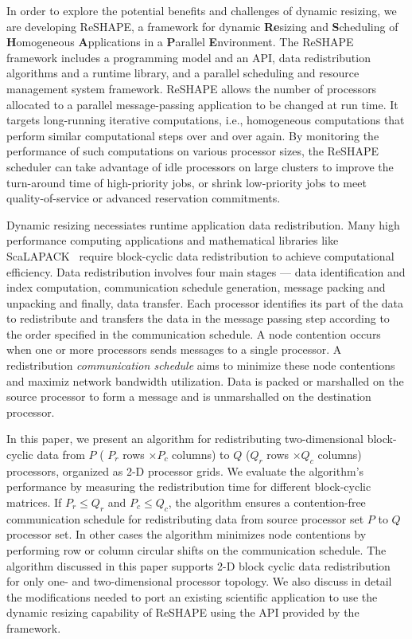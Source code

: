 \documentclass[letterpaper]{llncs}
\begin{document}
In order to explore the potential benefits and challenges of dynamic resizing, we are developing ReSHAPE, a framework for dynamic {\bf Re}sizing and {\bf S}cheduling of {\bf H}omo\-geneous {\bf A}pplications in a {\bf P}arallel {\bf E}nvironment. The ReSHAPE framework includes a programming model and an API, data redistribution algorithms and a runtime library, and a parallel scheduling and resource management system 
framework. 
ReSHAPE allows the number of processors allocated to a parallel message-passing application to be changed at run time.  
It targets long-running iterative computations, i.e., homogeneous computations that perform similar computational steps over and over again. 
By monitoring the performance of such computations on various processor sizes, 
the ReSHAPE scheduler can take advantage of idle processors on large 
clusters to improve the turn-around time of high-priority jobs, 
or shrink low-priority jobs to meet quality-of-service or advanced 
reservation commitments.

\vspace{-0.01in}
Dynamic resizing necessiates runtime application data redistribution.
Many high performance computing applications and mathematical libraries like ScaLAPACK~\cite{scalapack} require block-cyclic data redistribution to achieve 
computational efficiency. 
Data redistribution involves four main stages --- data identification and 
index computation, communication schedule generation, message packing and unpacking
 and finally, data transfer. 
Each processor identifies its part of the data to redistribute and transfers the 
data in the message passing step according to the order specified in the 
communication schedule. A node contention occurs when one or more processors
sends messages to a single processor. A redistribution \textit{communication schedule}
 aims to 
minimize these node contentions and maximiz network bandwidth utilization.
Data is packed or marshalled on the source processor to form a message and is unmarshalled on the destination processor.

\vspace{-0.01in}
In this paper, we present an algorithm for redistributing two-dimensional 
block-cyclic data from $P$ ( $P_r$ rows $\times P_c$ columns) to $Q$ 
($Q_r$ rows $\times Q_c$ columns) processors, organized as 2-D processor grids. 
We evaluate the algorithm's 
performance by measuring the redistribution time for different block-cyclic matrices.
If $P_r \leq Q_r$ and $P_c \leq Q_c$, the algorithm  ensures a contention-free communication schedule for redistributing data from source processor set $P$ to $Q$ processor set.
In other cases the algorithm minimizes node contentions by performing row or column circular shifts on the communication schedule. 
The algorithm discussed in this paper supports 2-D block cyclic data redistribution 
for only one- and two-dimensional processor topology.
We also discuss in detail the modifications needed to port an existing scientific application to use the dynamic resizing capability of ReSHAPE using the API provided by the framework.
\end{document}
